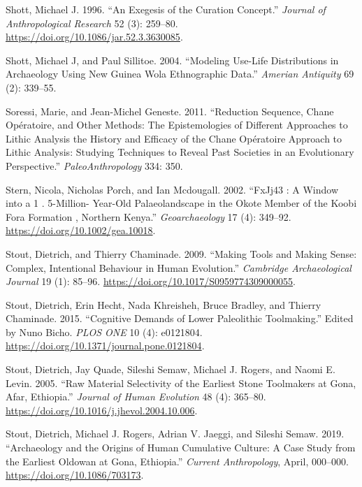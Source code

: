 \documentclass[]{elsarticle} %
\begin{document}
\leavevmode\hypertarget{ref-shottExegesisCurationConcept1996}{}%
Shott, Michael J. 1996. ``An Exegesis of the Curation Concept.''
\emph{Journal of Anthropological Research} 52 (3): 259--80.
\url{https://doi.org/10.1086/jar.52.3.3630085}.

\leavevmode\hypertarget{ref-shottModelingUseLifeDistributions2004}{}%
Shott, Michael J, and Paul Sillitoe. 2004. ``Modeling Use-Life
Distributions in Archaeology Using New Guinea Wola Ethnographic Data.''
\emph{Amerian Antiquity} 69 (2): 339--55.

\leavevmode\hypertarget{ref-soressi2011reduction}{}%
Soressi, Marie, and Jean-Michel Geneste. 2011. ``Reduction Sequence,
Chane Opératoire, and Other Methods: The Epistemologies of Different
Approaches to Lithic Analysis the History and Efficacy of the Chane
Opératoire Approach to Lithic Analysis: Studying Techniques to Reveal
Past Societies in an Evolutionary Perspective.''
\emph{PaleoAnthropology} 334: 350.

\leavevmode\hypertarget{ref-sternFxJj43Window5Million2002}{}%
Stern, Nicola, Nicholas Porch, and Ian Mcdougall. 2002. ``FxJj43 : A
Window into a 1 . 5-Million- Year-Old Palaeolandscape in the Okote
Member of the Koobi Fora Formation , Northern Kenya.''
\emph{Geoarchaeology} 17 (4): 349--92.
\url{https://doi.org/10.1002/gea.10018}.

\leavevmode\hypertarget{ref-stoutMakingToolsMaking2009}{}%
Stout, Dietrich, and Thierry Chaminade. 2009. ``Making Tools and Making
Sense: Complex, Intentional Behaviour in Human Evolution.''
\emph{Cambridge Archaeological Journal} 19 (1): 85--96.
\url{https://doi.org/10.1017/S0959774309000055}.

\leavevmode\hypertarget{ref-stoutCognitiveDemandsLower2015}{}%
Stout, Dietrich, Erin Hecht, Nada Khreisheh, Bruce Bradley, and Thierry
Chaminade. 2015. ``Cognitive Demands of Lower Paleolithic Toolmaking.''
Edited by Nuno Bicho. \emph{PLOS ONE} 10 (4): e0121804.
\url{https://doi.org/10.1371/journal.pone.0121804}.

\leavevmode\hypertarget{ref-stoutRawMaterialSelectivity2005}{}%
Stout, Dietrich, Jay Quade, Sileshi Semaw, Michael J. Rogers, and Naomi
E. Levin. 2005. ``Raw Material Selectivity of the Earliest Stone
Toolmakers at Gona, Afar, Ethiopia.'' \emph{Journal of Human Evolution}
48 (4): 365--80. \url{https://doi.org/10.1016/j.jhevol.2004.10.006}.

\leavevmode\hypertarget{ref-stoutArchaeologyOriginsHuman2019}{}%
Stout, Dietrich, Michael J. Rogers, Adrian V. Jaeggi, and Sileshi Semaw.
2019. ``Archaeology and the Origins of Human Cumulative Culture: A Case
Study from the Earliest Oldowan at Gona, Ethiopia.'' \emph{Current
Anthropology}, April, 000--000. \url{https://doi.org/10.1086/703173}.
\end{document}
